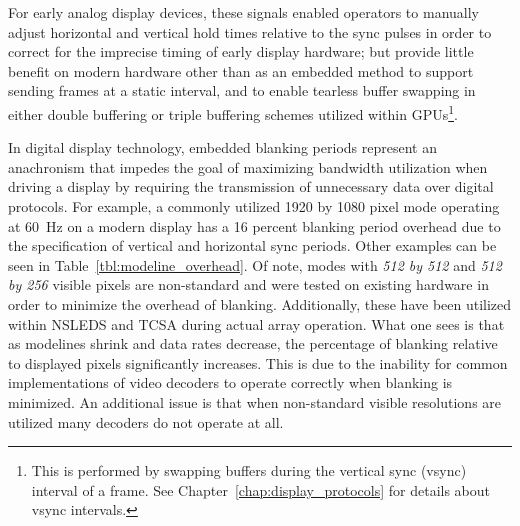     For early analog display devices, these signals enabled operators to manually adjust horizontal and vertical hold times relative to the sync pulses in order to correct for the imprecise timing of early display hardware; but provide little benefit on modern hardware other than as an embedded method to support sending frames at a static interval, and to enable tearless buffer swapping in either double buffering\cite{FriedbergEtAl1990} or triple buffering schemes\cite{3dfx1997} utilized within GPUs\footnote{This is performed by swapping buffers during the vertical sync (vsync) interval of a frame\cite{3dfx1999,3dfx1999_2}. See Chapter~\ref{chap:display_protocols} for details about vsync intervals.}.

    In digital display technology, embedded blanking periods represent an anachronism that impedes the goal of maximizing bandwidth utilization when driving a display by requiring the transmission of unnecessary data over digital protocols. For example, a commonly utilized 1920 by 1080 pixel mode operating at \mbox{60 Hz}\cite{MythTV2015} on a modern display has a 16 percent blanking period overhead due to the specification of vertical and horizontal sync periods. Other examples can be seen in Table~\ref{tbl:modeline_overhead}. Of note, modes with {\it 512 by 512} and {\it 512 by 256} visible pixels are non-standard and were tested on existing hardware in order to minimize the overhead of blanking. Additionally, these have been utilized within NSLEDS and TCSA during actual array operation. What one sees is that as modelines shrink and data rates decrease, the percentage of blanking relative to displayed pixels significantly increases. This is due to the inability for common implementations of video decoders to operate correctly when blanking is minimized. An additional issue is that when non-standard visible resolutions are utilized many decoders do not operate at all.

